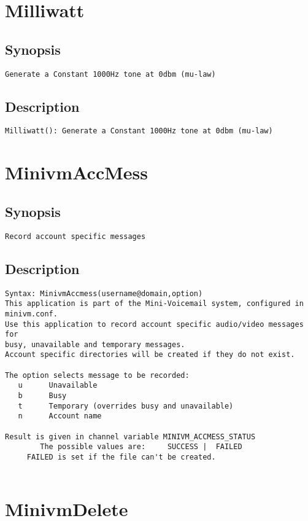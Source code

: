 \section{Milliwatt}
\subsection{Synopsis}
\begin{verbatim}
Generate a Constant 1000Hz tone at 0dbm (mu-law)
\end{verbatim}
\subsection{Description}
\begin{verbatim}
Milliwatt(): Generate a Constant 1000Hz tone at 0dbm (mu-law)

\end{verbatim}


\section{MinivmAccMess}
\subsection{Synopsis}
\begin{verbatim}
Record account specific messages
\end{verbatim}
\subsection{Description}
\begin{verbatim}
Syntax: MinivmAccmess(username@domain,option)
This application is part of the Mini-Voicemail system, configured in minivm.conf.
Use this application to record account specific audio/video messages for
busy, unavailable and temporary messages.
Account specific directories will be created if they do not exist.

The option selects message to be recorded:
   u      Unavailable
   b      Busy
   t      Temporary (overrides busy and unavailable)
   n      Account name

Result is given in channel variable MINIVM_ACCMESS_STATUS
        The possible values are:     SUCCESS |  FAILED
	 FAILED is set if the file can't be created.


\end{verbatim}


\section{MinivmDelete}
